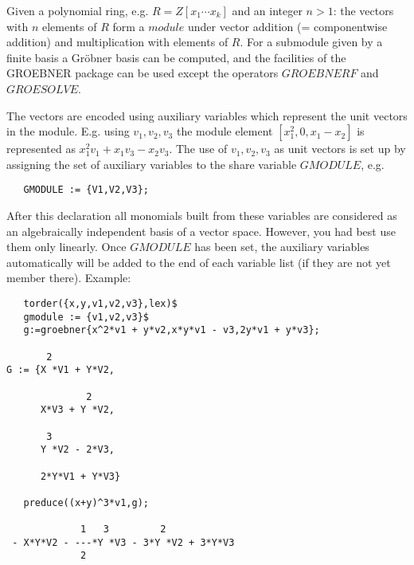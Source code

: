 Given a polynomial ring, e.g. $R=Z[x_1 \cdots x_k]$ and
an integer $n>1$: the vectors with $n$ elements of $R$
form a $module$ under vector addition (= componentwise addition)
and multiplication with elements of $R$. For a submodule
given by a finite basis a Gr\"obner basis
can be computed, and the facilities of the GROEBNER package
can be used except the operators $GROEBNERF$ and $GROESOLVE$.

The vectors are encoded using auxiliary variables which represent
the unit vectors in the module. E.g. using ${v_1,v_2,v_3}$ the
module element $[x_1^2,0,x_1-x_2]$ is represented as
$x_1^2 v_1 + x_1 v_3 - x_2 v_3$. The use of ${v_1,v_2,v_3}$
as unit vectors is set up by assigning the set of auxiliary variables
to the share variable $GMODULE$, e.g.
\begin{verbatim}
   GMODULE := {V1,V2,V3};
\end{verbatim}
After this declaration all monomials built from these variables
are considered as an algebraically independent basis of a vector
space. However, you had best use them only linearly. Once $GMODULE$
has been set, the auxiliary variables automatically will be
added to the end of each variable list (if they are not yet
member there).
Example:
\begin{verbatim}
   torder({x,y,v1,v2,v3},lex)$
   gmodule := {v1,v2,v3}$
   g:=groebner{x^2*v1 + y*v2,x*y*v1 - v3,2y*v1 + y*v3};

       2
G := {X *V1 + Y*V2,

              2
      X*V3 + Y *V2,

       3
      Y *V2 - 2*V3,

      2*Y*V1 + Y*V3}

   preduce((x+y)^3*v1,g);

             1   3         2
 - X*Y*V2 - ---*Y *V3 - 3*Y *V2 + 3*Y*V3
             2

\end{verbatim}

